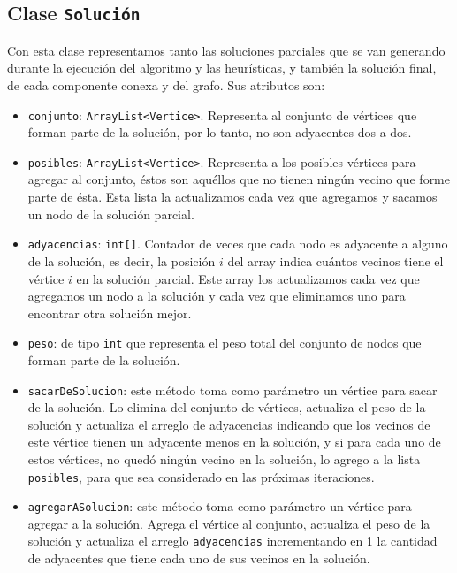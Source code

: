 \documentclass[a4paper, 10pt]{article}
\begin{document}
\subsection{Clase \texttt{Soluci\'on}}
Con esta clase representamos tanto las soluciones parciales que se van generando durante la ejecuci\'on del algoritmo y las heur\'isticas, y tambi\'en la soluci\'on final, de cada componente conexa y del grafo. Sus atributos son:
\begin{itemize}
\item \texttt{conjunto}: \texttt{ArrayList<Vertice>}. Representa al conjunto de v\'ertices que forman parte de la soluci\'on, por lo tanto, no son adyacentes dos a dos.

\item \texttt{posibles}: \texttt{ArrayList<Vertice>}. Representa a los posibles v\'ertices para agregar al conjunto, \'estos son aqu\'ellos que no tienen ning\'un vecino que forme parte de \'esta. Esta lista la actualizamos cada vez que agregamos y sacamos un nodo de la soluci\'on parcial.

\item \texttt{adyacencias}: \texttt{int[]}. Contador de veces que cada nodo es adyacente a alguno de la soluci\'on, es decir, la posici\'on $i$ del array indica cu\'antos vecinos tiene el v\'ertice $i$ en la soluci\'on parcial. Este array los actualizamos cada vez que agregamos un nodo a la soluci\'on y cada vez que eliminamos uno para encontrar otra soluci\'on mejor.

\item \texttt{peso}: de tipo \texttt{int} que representa el peso total del conjunto de nodos que forman parte de la soluci\'on.

\item \texttt{sacarDeSolucion}: este m\'etodo toma como par\'ametro un v\'ertice para sacar de la soluci\'on. Lo elimina del conjunto de v\'ertices, actualiza el peso de la soluci\'on y actualiza el arreglo de adyacencias indicando que los vecinos de este v\'ertice tienen un adyacente menos en la soluci\'on, y si para cada uno de estos v\'ertices, no qued\'o ning\'un vecino en la soluci\'on, lo agrego a la lista \texttt{posibles}, para que sea considerado en las pr\'oximas iteraciones.

\item \texttt{agregarASolucion}: este m\'etodo toma como par\'ametro un v\'ertice para agregar a la soluci\'on. Agrega el v\'ertice al conjunto, actualiza el peso de la soluci\'on y actualiza el arreglo \texttt{adyacencias} incrementando en 1 la cantidad de adyacentes que tiene cada uno de sus vecinos en la soluci\'on.
\end{itemize}
\end{document}
